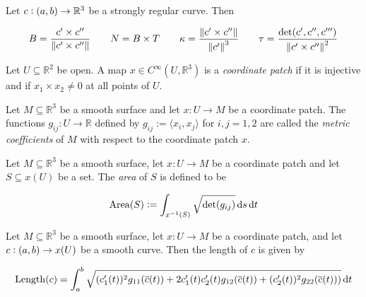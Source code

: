 \vspace{1mm}

\begin{lemma}
	Let $c: \intoo{a,b} \to \mathbb{R}^3$ be a strongly regular curve. Then

	\begin{equation}
		B = \frac{c' \times c''}{\norm[0]{c' \times c''}} \qquad N = B \times T \qquad \kappa = \frac{\norm[0]{c' \times c''}}{\norm[0]{c'}^3} \qquad \tau = \frac{\det(c',c'',c''')}{\norm[0]{c' \times c''}^2}
	\end{equation}
\end{lemma}

\vspace{1mm}

\begin{definition}
	Let $U \subseteq \mathbb{R}^2$ be open. A map $x \in C^\infty(U, \mathbb{R}^3)$ is a \emph{coordinate patch} if it is injective and if $x_1 \times x_2 \neq 0$ at all points of $U$. 
\end{definition}

\vspace{1mm}

\begin{definition}
	Let $M \subseteq \mathbb{R}^3$ be a smooth surface and let $x: U \to M$ be a coordinate patch. The functions $g_{ij}: U \to \mathbb{R}$ defined by $g_{ij} := \langle x_i,x_j\rangle$ for $i,j = 1,2$ are called the \emph{metric coefficients} of $M$ with respect to the coordinate patch $x$.
\end{definition}

\vspace{1mm}

\begin{definition}
	Let $M \subseteq \mathbb{R}^3$ be a smooth surface, let $x: U \to M$ be a coordinate patch and let $S \subseteq x(U)$ be a set. The \emph{area} of $S$ is defined to be

	\begin{equation}
		\operatorname{Area}(S) := \int_{x^{-1}(S)} \sqrt{\det(g_{ij})} \mathop{}\!\mathrm{d} s \mathop{}\!\mathrm{d} t
	\end{equation}
\end{definition}

\vspace{1mm}

\begin{lemma}
	Let $M \subseteq \mathbb{R}^3$ be a smooth surface, let $x: U \to M$ be a coordinate patch, and let $c: \intoo{a,b} \to x(U)$ be a smooth curve. Then the length of $c$ is given by 

	\begin{equation}
		\operatorname{Length}(c) = \int_{a}^b \sqrt{(c_1'(t))^2g_{11}(\overline{c}(t)) + 2c_1'(t)c_2'(t)g_{12}(\overline{c}(t)) + (c'_2(t))^2g_{22}(\overline{c}(t)))}\mathop{}\!\mathrm{d} t
	\end{equation}
\end{lemma}

